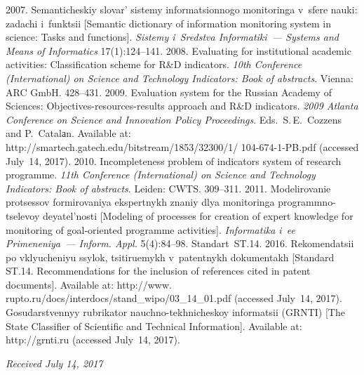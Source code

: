 \begin{multicols}{2}
{{\begin{thebibliography}{99}
 2007. Se\-man\-ti\-che\-skiy slovar' 
sistemy informatsionnogo monitoringa v~sfere nauki: zadachi i~funktsii 
[Semantic dictionary of information monitoring system in science: Tasks and 
functions]. \textit{Sistemy i~Sredstva Informatiki~--- Systems and Means of 
Informatics} 17(1):124--141.
 2008. Evaluating for institutional 
academic activities: Classification scheme for R\&D indicators. \textit{10th 
Conference (International) on Science and Technology Indicators: 
Book of abstracts}. Vienna: ARC GmbH.  
428--431.
 2009. Evaluation system for the 
Russian Academy of Sciences: Objectives-resources-results approach and 
R\&D indicators. \textit{2009 Atlanta Conference on Science and Innovation 
Policy Proceedings}. Eds.\ S.\,E.~Cozzens and P.~Catalаn. Available at: 
{\sf http://smartech.gatech.edu/bitstream/1853/32300/1/ 104-674-1-PB.pdf} 
(accessed July~14, 2017).
 2010. Incompleteness problem of 
indicators system of research programme. \textit{11th Conference 
(International) on Science and Technology Indicators: Book of 
abstracts}. Leiden: CWTS. 309--311.
 2011. Modelirovanie 
protsessov formirovaniya ekspertnykh znaniy dlya monitoringa  
programmno-tselevoy deyatel'nosti [Modeling of processes for creation of 
expert knowledge for monitoring of goal-oriented programme activities]. 
\textit{Informatika i~ee Primeneniya~--- Inform. Appl.} 5(4):84--98.
Standart~ST.14. 2016. Rekomendatsii po vklyucheniyu ssylok, tsitiruemykh 
v~patentnykh dokumentakh [Standard ST.14. Recommendations for the 
inclusion of references cited in patent documents]. Available at:  {\sf 
http://www. rupto.ru/docs/interdocs/stand\_wipo/03\_14\_01.pdf} (accessed 
July~14, 2017).
Gosudarstvennyy rubrikator na\-uch\-no-tekh\-ni\-che\-skoy informatsii (GRNTI)
[The State Classifier of Scientific and Technical Information]. Available at:  
{\sf http://grnti.ru} (accessed July~14, 2017).
\end{thebibliography} } }

\end{multicols}

\vspace*{-12pt}

\hfill{\small\textit{Received July 14, 2017}}



